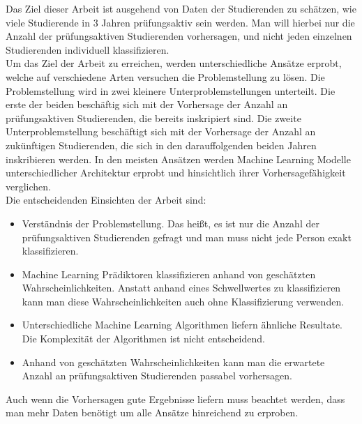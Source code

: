 

Das Ziel dieser Arbeit ist ausgehend von Daten der Studierenden zu sch\"atzen, wie viele
Studierende in 3 Jahren pr\"ufungsaktiv sein werden. Man will hierbei nur die Anzahl der pr\"ufungsaktiven Studierenden vorhersagen,
und nicht jeden einzelnen Studierenden individuell klassifizieren.\\

Um das Ziel der Arbeit zu erreichen, werden unterschiedliche Ans\"atze erprobt, welche auf verschiedene Arten versuchen die Problemstellung zu l\"osen.
Die Problemstellung wird in zwei kleinere Unterproblemstellungen unterteilt. Die erste der beiden besch\"aftig sich mit der Vorhersage der Anzahl an pr\"ufungsaktiven Studierenden,
die bereits inskripiert sind. Die zweite Unterproblemstellung besch\"aftigt sich mit der Vorhersage der Anzahl an zuk\"unftigen Studierenden, die sich in den darauffolgenden beiden Jahren inskribieren werden.
In den meisten Ans\"atzen werden Machine Learning Modelle unterschiedlicher Architektur erprobt und hinsichtlich ihrer Vorhersagef\"ahigkeit
verglichen.\\

Die entscheidenden Einsichten der Arbeit sind:
\begin{itemize}
    \item Verst\"andnis der Problemstellung. Das hei{\ss}t, es ist nur die Anzahl der pr\"ufungsaktiven Studierenden gefragt und man muss nicht jede Person exakt klassifizieren.
    \item Machine Learning Pr\"adiktoren klassifizieren anhand von gesch\"atzten Wahrscheinlichkeiten. Anstatt anhand eines Schwellwertes zu klassifizieren
          kann man diese Wahrscheinlichkeiten auch ohne Klassifizierung verwenden.
    \item Unterschiedliche Machine Learning Algorithmen liefern \"ahnliche Resultate. Die Komplexit\"at der Algorithmen ist nicht entscheidend.
    \item Anhand von gesch\"atzten Wahrscheinlichkeiten kann man die erwartete Anzahl an pr\"ufungsaktiven Studierenden passabel vorhersagen.
\end{itemize}

Auch wenn die Vorhersagen gute Ergebnisse liefern muss beachtet werden, dass man mehr Daten ben\"otigt um alle Ans\"atze hinreichend zu erproben.
